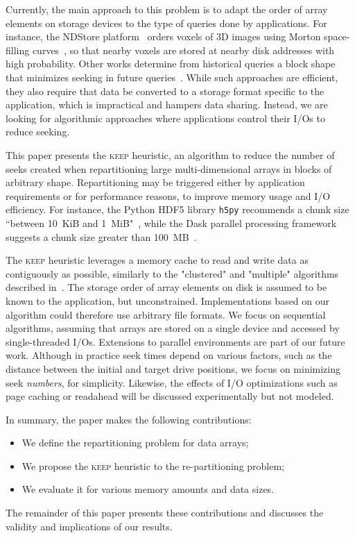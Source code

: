\documentclass[sigconf, nonacm]{acmart}
\newcommand{\keep}[0]{\textsc{keep}\xspace}
\begin{document}
Currently, the main approach to this problem is to adapt the order of array
elements on storage devices to the type of queries done by applications.
For instance, the NDStore platform~\cite{lillaney2018building} orders voxels of 3D images
using Morton space-filling curves~\cite{morton1966computer}, so that nearby
voxels are stored at nearby disk addresses with high
probability. Other works determine from historical queries a
block shape that minimizes seeking
in future queries~\cite{optimal_chuking}.
While such approaches are efficient, they also require that data
be converted to a storage format specific to the application, which is
impractical and hampers data sharing. Instead, we are looking for
algorithmic approaches where applications control their I/Os to reduce seeking.

This paper presents the \keep heuristic, an algorithm to reduce the
number of seeks created when repartitioning large multi-dimensional arrays in blocks of
arbitrary shape. Repartitioning may be triggered either by application requirements
 or for performance reasons, to improve
memory usage and I/O efficiency. For instance, the Python HDF5 library
\texttt{h5py} recommends a chunk size ``between 10~KiB and 1~MiB"~\cite{collette_2014}, while the Dask parallel processing framework
~\cite{matthew_rocklin-proc-scipy-2015} suggests a chunk size greater than
100~MB~\cite{rocklin_bourbeau_2019}.

The \keep heuristic leverages a memory cache to read and write data as
contiguously as possible, similarly to the "clustered" and "multiple"
algorithms described in~\cite{seqalgorithms}. The storage order of array
elements on disk is assumed to be known to the application, but unconstrained.
Implementations based on our algorithm could therefore use arbitrary file
formats. We focus on sequential algorithms, assuming that arrays are stored
on a single device and accessed by single-threaded I/Os. Extensions to parallel
environments are part of our future work. Although in practice seek times
depend on various factors, such as the distance between the initial and
target drive positions, we focus on minimizing seek \emph{numbers}, for
simplicity. Likewise, the effects of I/O optimizations such as page caching
or readahead will be discussed experimentally but not modeled.

In summary, the paper makes the following contributions:
\begin{itemize}
  \item We define the repartitioning problem for data arrays;
  \item We propose the \keep heuristic to the re-partitioning problem;
  \item We evaluate it for various memory amounts and data sizes.
\end{itemize}
The remainder of this paper presents these contributions and discusses the
validity and implications of our results.
\end{document}
